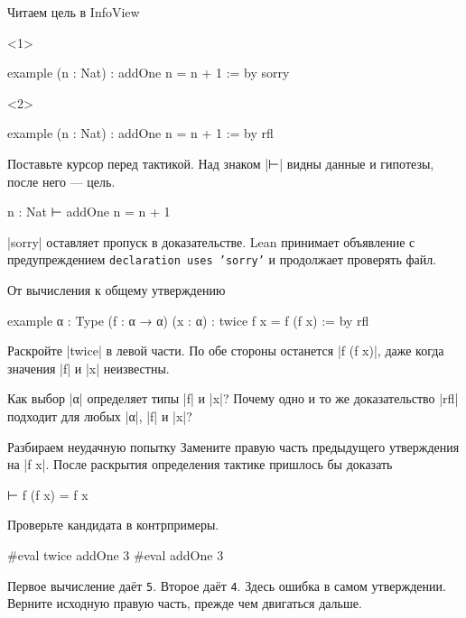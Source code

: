 \documentclass[aspectratio=169]{beamer}
\begin{document}
\begin{frame}[fragile]{Читаем цель в InfoView}
\begin{onlyenv}<1>
\begin{lean}
example (n : Nat) : addOne n = n + 1 := by
  sorry
\end{lean}
\end{onlyenv}
\begin{onlyenv}<2>
\begin{lean}
example (n : Nat) : addOne n = n + 1 := by
  rfl
\end{lean}
\end{onlyenv}
Поставьте курсор перед тактикой. Над знаком \leaninline|⊢| видны данные и гипотезы, после него — цель.
\begin{leanoutput}
n : Nat
⊢ addOne n = n + 1
\end{leanoutput}
\leaninline|sorry| оставляет пропуск в доказательстве. Lean принимает объявление с предупреждением \texttt{declaration uses 'sorry'} и продолжает проверять файл.

\end{frame}

\begin{frame}[fragile]{От вычисления к общему утверждению}
\begin{lean}
example {α : Type} (f : α → α) (x : α) :
    twice f x = f (f x) := by
  rfl
\end{lean}
Раскройте \leaninline|twice| в левой части. По обе стороны останется \leaninline|f (f x)|, даже когда значения \leaninline|f| и \leaninline|x| неизвестны.

Как выбор \leaninline|α| определяет типы \leaninline|f| и \leaninline|x|? Почему одно и то же доказательство \leaninline|rfl| подходит для любых \leaninline|α|, \leaninline|f| и \leaninline|x|?
\end{frame}

\begin{frame}[fragile]{Разбираем неудачную попытку}
Замените правую часть предыдущего утверждения на \leaninline|f x|. После раскрытия определения тактике пришлось бы доказать
\begin{leanoutput}
⊢ f (f x) = f x
\end{leanoutput}
Проверьте кандидата в контрпримеры.
\begin{lean}
#eval twice addOne 3
#eval addOne 3
\end{lean}
\pause
Первое вычисление даёт \texttt{5}. \pause Второе даёт \texttt{4}. Здесь ошибка в самом утверждении. Верните исходную правую часть, прежде чем двигаться дальше.
\end{frame}
\end{document}
